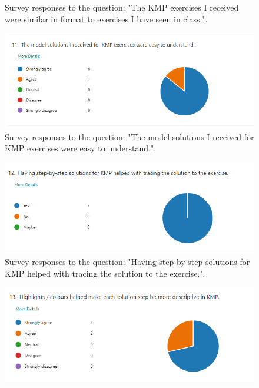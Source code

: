\documentclass{l4proj}
\begin{document}
\begin{appendices}
\begin{figure}[h]
    \caption{Survey responses to the question: "The KMP exercises I received were similar in format to exercises I have seen in class.".}
    \label{fig:k_similar_format} 
\end{figure}

\begin{figure}[h]
    \centering
    \includegraphics[width=0.9\linewidth]{images/k_model_solution.png}    

    \caption{Survey responses to the question: "The model solutions I received for KMP exercises were easy to understand.".}
    \label{fig:k_model_solution} 
\end{figure}

\begin{figure}[h]
    \centering
    \includegraphics[width=0.9\linewidth]{images/k_step_by_step.png}    

    \caption{Survey responses to the question: "Having step-by-step solutions for KMP helped with tracing the solution to the exercise.".}
    \label{fig:k_step_by_step} 
\end{figure}

\begin{figure}[h]
    \centering
    \includegraphics[width=0.9\linewidth]{images/k_highlights.png}    


\end{figure}
\end{appendices}
\end{document}
